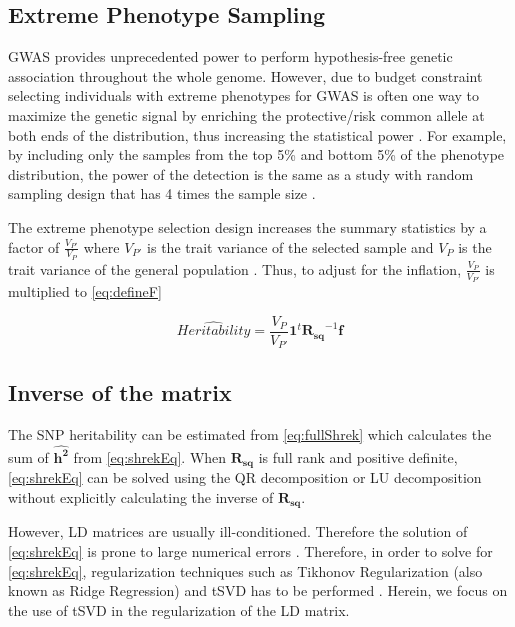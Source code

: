 		\subsection{Extreme Phenotype Sampling}
			\gls{GWAS} provides unprecedented power to perform hypothesis-free genetic association throughout the whole genome.
			However, due to budget constraint selecting individuals with extreme phenotypes for \gls{GWAS} is often one way to maximize the genetic signal by enriching the protective/risk common allele at both ends of the distribution, thus increasing the statistical power \citep{Guey2011}.
			For example, by including only the samples from the top 5\% and bottom 5\% of the phenotype distribution, the power of the detection is the same as a study with random sampling design that has 4 times the sample size \citep{Sham2014}. 
			
			The extreme phenotype selection design increases the summary statistics by a factor of $\frac{V_{P'}}{V_P}$ where $V_{P'}$ is the trait variance of the selected sample and $V_P$ is the trait variance of the general population \citep{Sham2014}.
			Thus, to adjust for the inflation, $\frac{V_P}{V_{P'}}$ is multiplied to \cref{eq:defineF}
			
			\begin{equation}
			\hat{Heritability} = \frac{V_P}{V_{P'}}\boldsymbol{1}^t\boldsymbol{R_{sq}}^{-1}\boldsymbol{f}
			\label{eq:extremeShrek}
			\end{equation}
			
		\subsection{Inverse of the  matrix}
			The \gls{SNP} heritability can be estimated from \cref{eq:fullShrek} which calculates the sum of $\boldsymbol{\hat{h^2}}$ from \cref{eq:shrekEq}.
			When $\boldsymbol{R_{sq}}$ is full rank and positive definite, \cref{eq:shrekEq} can be solved using the QR decomposition or LU decomposition without explicitly calculating the inverse of $\boldsymbol{R_{sq}}$.
			
			However, \gls{LD} matrices are usually ill-conditioned.
			Therefore the solution of \cref{eq:shrekEq} is prone to large numerical errors \citep{Neumaier1998}.
			Therefore, in order to solve for \cref{eq:shrekEq}, regularization techniques such as Tikhonov Regularization (also known as Ridge Regression) and \gls{tSVD} has to be performed \citep{Neumaier1998}. 
			Herein, we focus on the use of \gls{tSVD} in the regularization of the \gls{LD} matrix.
			

